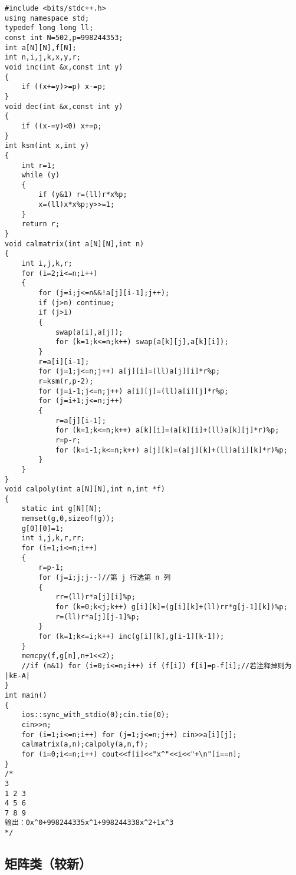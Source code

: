\documentclass[12pt]{ctexart}
\begin{document}
\begin{lstlisting}
#include <bits/stdc++.h>
using namespace std;
typedef long long ll;
const int N=502,p=998244353;
int a[N][N],f[N];
int n,i,j,k,x,y,r;
void inc(int &x,const int y)
{
	if ((x+=y)>=p) x-=p;
}
void dec(int &x,const int y)
{
	if ((x-=y)<0) x+=p;
}
int ksm(int x,int y)
{
	int r=1;
	while (y)
	{
		if (y&1) r=(ll)r*x%p;
		x=(ll)x*x%p;y>>=1;
	}
	return r;
}
void calmatrix(int a[N][N],int n)
{
	int i,j,k,r;
	for (i=2;i<=n;i++)
	{
		for (j=i;j<=n&&!a[j][i-1];j++);
		if (j>n) continue;
		if (j>i)
		{
			swap(a[i],a[j]);
			for (k=1;k<=n;k++) swap(a[k][j],a[k][i]);
		}
		r=a[i][i-1];
		for (j=1;j<=n;j++) a[j][i]=(ll)a[j][i]*r%p;
		r=ksm(r,p-2);
		for (j=i-1;j<=n;j++) a[i][j]=(ll)a[i][j]*r%p;
		for (j=i+1;j<=n;j++)
		{
			r=a[j][i-1];
			for (k=1;k<=n;k++) a[k][i]=(a[k][i]+(ll)a[k][j]*r)%p;
			r=p-r;
			for (k=i-1;k<=n;k++) a[j][k]=(a[j][k]+(ll)a[i][k]*r)%p;
		}
	}
}
void calpoly(int a[N][N],int n,int *f)
{
	static int g[N][N];
	memset(g,0,sizeof(g));
	g[0][0]=1;
	int i,j,k,r,rr;
	for (i=1;i<=n;i++)
	{
		r=p-1;
		for (j=i;j;j--)//第 j 行选第 n 列
		{
			rr=(ll)r*a[j][i]%p;
			for (k=0;k<j;k++) g[i][k]=(g[i][k]+(ll)rr*g[j-1][k])%p;
			r=(ll)r*a[j][j-1]%p;
		}
		for (k=1;k<=i;k++) inc(g[i][k],g[i-1][k-1]);
	}
	memcpy(f,g[n],n+1<<2);
	//if (n&1) for (i=0;i<=n;i++) if (f[i]) f[i]=p-f[i];//若注释掉则为 |kE-A|
}
int main()
{
	ios::sync_with_stdio(0);cin.tie(0);
	cin>>n;
	for (i=1;i<=n;i++) for (j=1;j<=n;j++) cin>>a[i][j];
	calmatrix(a,n);calpoly(a,n,f);
	for (i=0;i<=n;i++) cout<<f[i]<<"x^"<<i<<"+\n"[i==n];
}
/*
3
1 2 3
4 5 6
7 8 9
输出：0x^0+998244335x^1+998244338x^2+1x^3
*/
\end{lstlisting}

\subsection{矩阵类（较新）}
\end{document}
